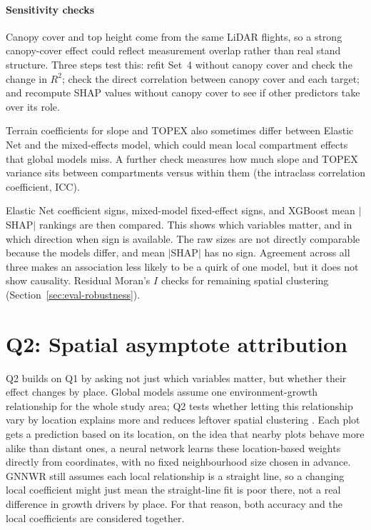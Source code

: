 \documentclass[logo,msc,ai]{infthesis}           %
\begin{document}
\paragraph*{Sensitivity checks} Canopy cover and top height come from the same LiDAR flights, so a strong canopy-cover effect could reflect measurement overlap rather than real stand structure. Three steps test this: refit Set~4 without canopy cover and check the change in $R^2$; check the direct correlation between canopy cover and each target; and recompute SHAP values without canopy cover to see if other predictors take over its role.

Terrain coefficients for slope and TOPEX also sometimes differ between Elastic Net and the mixed-effects model, which could mean local compartment effects that global models miss. A further check measures how much slope and TOPEX variance sits between compartments versus within them (the intraclass correlation coefficient, ICC).

Elastic Net coefficient signs, mixed-model fixed-effect signs, and XGBoost mean $|$SHAP$|$ rankings are then compared. This shows which variables matter, and in which direction when sign is available. The raw sizes are not directly comparable because the models differ, and mean $|$SHAP$|$ has no sign. Agreement across all three makes an association less likely to be a quirk of one model, but it does not show causality. Residual Moran's $I$ checks for remaining spatial clustering (Section~\ref{sec:eval-robustness}).
\section{Q2: Spatial asymptote attribution}
Q2 builds on Q1 by asking not just which variables matter, but whether their effect changes by place. Global models assume one environment-growth relationship for the whole study area; Q2 tests whether letting this relationship vary by location explains more and reduces leftover spatial clustering \cite{du2020Geographically_C6_GWR}. Each plot gets a prediction based on its location, on the idea that nearby plots behave more alike than distant ones, a neural network learns these location-based weights directly from coordinates, with no fixed neighbourhood size chosen in advance. GNNWR still assumes each local relationship is a straight line, so a changing local coefficient might just mean the straight-line fit is poor there, not a real difference in growth drivers by place. For that reason, both accuracy and the local coefficients are considered together.
\end{document}

